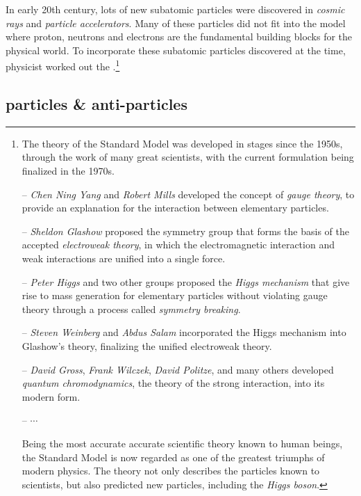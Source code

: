In early 20th century, lots of new subatomic particles were discovered in \emph{cosmic rays} and \emph{particle accelerators}. Many of these particles did not fit into the model where proton, neutrons and electrons are the fundamental building blocks for the physical world. To incorporate these subatomic particles discovered at the time, physicist worked out the .\footnote[][-3cm]{The theory of the Standard Model was developed in stages since the 1950s, through the work of many great scientists, with the current formulation being finalized in the 1970s.
	\begin{compactitem}
		\item[--] \emph{Chen Ning Yang} and \emph{Robert Mills} developed the concept of \emph{gauge theory}, to provide an explanation for the interaction between elementary particles.
		
		\item[--] \emph{Sheldon Glashow} proposed the symmetry group that forms the basis of the accepted \emph{electroweak theory}, in which the electromagnetic interaction and weak interactions are unified into a single force.
		
		\item[--] \emph{Peter Higgs} and two other groups proposed the \emph{Higgs mechanism} that give rise to mass generation for elementary particles without violating gauge theory through a process called \emph{symmetry breaking}.
		
		\item[--] \emph{Steven Weinberg} and \emph{Abdus Salam} incorporated the Higgs mechanism into Glashow's theory, finalizing the unified electroweak theory.
		
		\item[--] \emph{David Gross}, \emph{Frank Wilczek}, \emph{David Politze}, and many others developed \emph{quantum chromodynamics}, the theory of the strong interaction, into its modern form.
		
		\item[--] $\cdots$
	\end{compactitem}

Being the most accurate accurate scientific theory known to human beings, the Standard Model is now regarded as one of the greatest triumphs of modern physics. The theory not only describes the particles known to scientists, but also predicted new particles, including the \emph{Higgs boson}. }


\subsection{particles \& anti-particles}

